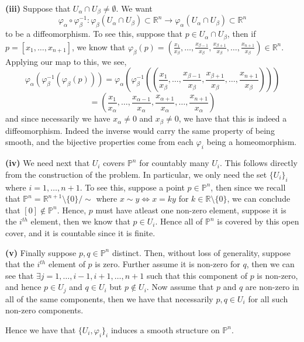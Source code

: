 \documentclass[10pt]{article}
\newcommand{\R}{\mathbb{R}}
\newcommand{\Pro}{\mathbb{P}}
\begin{document}
\newpage

\textbf{(iii)}
Suppose that $U_{\alpha}\cap U_{\beta} \neq \emptyset$. We want
$$\varphi_{\alpha}\circ\varphi_{\beta}^{-1}: \varphi_{\beta}(U_{\alpha}\cap U_{\beta}) \subset \R^{n} \to \varphi_{\alpha}(U_{\alpha}\cap U_{\beta})\subset \R^{n}$$
to be a diffeomorphism. To see this, suppose that $p\in U_{\alpha}\cap U_{\beta}$, then if $p = [x_{1}, \dots, x_{n+1}]$, we know that $\varphi_{\beta}(p) = \left(\frac{x_{1}}{x_{\beta}},\dots,\frac{x_{\beta -1}}{x_{\beta}},\frac{x_{\beta+1}}{x_{\beta}},\dots,\frac{x_{n+1}}{x_{\beta}}\right)\in \R^{n}$. Applying our map to this, we see,
$$\varphi_{\alpha}(\varphi_{\beta}^{-1}(\varphi_{\beta}(p))) = \varphi_{\alpha}\left(\varphi_{\beta}^{-1}\left(\left(\frac{x_{1}}{x_{\beta}},\dots,\frac{x_{\beta -1}}{x_{\beta}},\frac{x_{\beta+1}}{x_{\beta}},\dots,\frac{x_{n+1}}{x_{\beta}}\right)\right)\right)$$
$$ = \left(\frac{x_{1}}{x_{\alpha}},\dots,\frac{x_{\alpha -1}}{x_{\alpha}},\frac{x_{\alpha+1}}{x_{\alpha}},\dots,\frac{x_{n+1}}{x_{\alpha}}\right)$$
and since necessarily we have $x_{\alpha} \neq 0$ and $x_{\beta} \neq 0$, we have that this is indeed a diffeomorphism. Indeed the inverse would carry the same property of being smooth, and the bijective properties come from each $\varphi_{i}$ being a homeomorphism.

\textbf{(iv)}
We need next that $U_{i}$ covers $\Pro^{n}$ for countably many $U_{i}$. This follows directly from the construction of the problem. In particular, we only need the set $\{U_{i}\}_{i}$ where $i = 1,\dots,n+1$. To see this, suppose a point $p\in \Pro^{n}$, then since we recall that $\Pro^{n} = \R^{n+1}\setminus\{0\}/\sim$ where $x \sim y \iff x = ky$ for $k\in \R\setminus \{0\}$, we can conclude that $[0]\notin \Pro^{n}$. Hence, $p$ must have atleast one non-zero element, suppose it is the $i^{th}$ element, then we know that $p\in U_{i}$. Hence all of $\Pro^{n}$ is covered by this open cover, and it is countable since it is finite.

\textbf{(v)} Finally suppose $p,q\in \Pro^{n}$ distinct. Then, without loss of generality, suppose that the $i^{th}$ element of $p$ is zero. Further assume it is non-zero for $q$, then we can see that $\exists j = 1,\dots,i-1,i+1,\dots,n+1$ such that this component of $p$ is non-zero, and hence $p\in U_{j}$ and $q\in U_{i}$ but $p\notin U_{i}$. Now assume that $p$ and $q$ are non-zero in all of the same components, then we have that necessarily $p,q\in U_{i}$ for all such non-zero components.

Hence we have that $\{U_{i},\varphi_{i}\}_{i}$ induces a smooth structure on $\Pro^{n}$.
\end{document}

